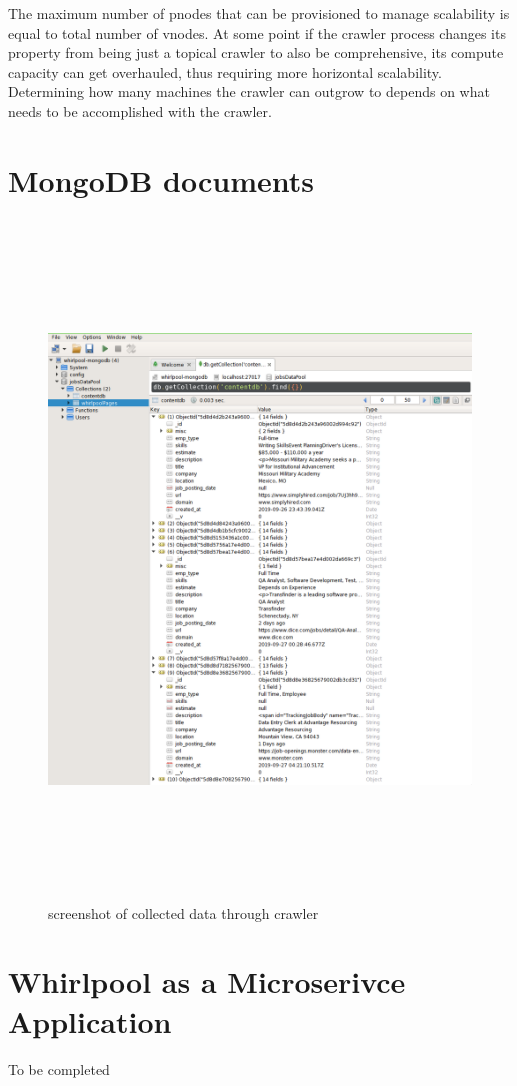 \noindent
The maximum number of pnodes that can be provisioned to manage scalability is equal to total number of
vnodes. At some point if the crawler process changes its property from being just a topical crawler to
also be comprehensive, its compute capacity can get overhauled, thus requiring more horizontal scalability.
Determining how many machines the crawler can outgrow to depends on what needs to be accomplished with the crawler.

\section{MongoDB documents}
\begin{figure}[h!]
  \centering
  \includegraphics[width=12cm,height=18cm,keepaspectratio]{../media/crawler/collecteddata.png}
  \caption{screenshot of collected data through crawler}
  \label{fig:mongo_data}
\end{figure}
\pagebreak



\section{Whirlpool as a Microserivce Application}
To be completed

\pagebreak